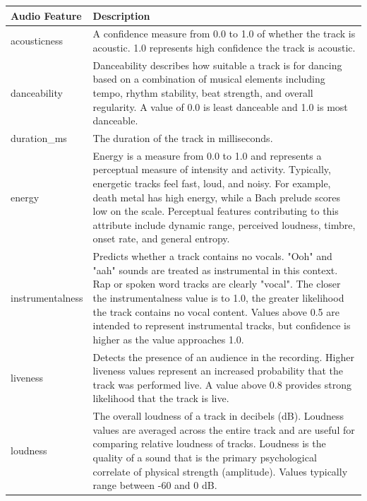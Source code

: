 \documentclass{article}
\begin{document}
\begin{table}[htbp]
    \centering
    \begin{tabular}{l p{}}
        \toprule
        \textbf{Audio Feature} & \textbf{Description} \\
        \midrule

        acousticness & A confidence measure from 0.0 to 1.0 of whether the track is acoustic. 1.0 represents high confidence the track is acoustic. \\[3pt]

        danceability & Danceability describes how suitable a track is for dancing based on a combination of musical elements including tempo, rhythm stability, beat strength, and overall regularity. A value of 0.0 is least danceable and 1.0 is most danceable. \\[3pt]

        duration\_ms & The duration of the track in milliseconds. \\[3pt]

        energy & Energy is a measure from 0.0 to 1.0 and represents a perceptual measure of intensity and activity. Typically, energetic tracks feel fast, loud, and noisy. For example, death metal has high energy, while a Bach prelude scores low on the scale. Perceptual features contributing to this attribute include dynamic range, perceived loudness, timbre, onset rate, and general entropy. \\[3pt]

        instrumentalness & Predicts whether a track contains no vocals. "Ooh" and "aah" sounds are treated as instrumental in this context. Rap or spoken word tracks are clearly "vocal". The closer the instrumentalness value is to 1.0, the greater likelihood the track contains no vocal content. Values above 0.5 are intended to represent instrumental tracks, but confidence is higher as the value approaches 1.0. \\[3pt]

        liveness & Detects the presence of an audience in the recording. Higher liveness values represent an increased probability that the track was performed live. A value above 0.8 provides strong likelihood that the track is live. \\[3pt]

        loudness & The overall loudness of a track in decibels (dB). Loudness values are averaged across the entire track and are useful for comparing relative loudness of tracks. Loudness is the quality of a sound that is the primary psychological correlate of physical strength (amplitude). Values typically range between -60 and 0 dB. \\[3pt]


\end{tabular}
\end{table}
\end{document}
